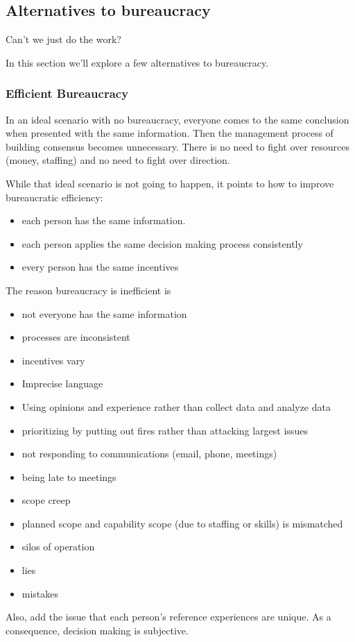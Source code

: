 \subsection{Alternatives to bureaucracy \label{sec:alternatives_to_bureaucracy}}
Can't we just do the work?

In this section we'll explore a few alternatives to bureaucracy. 




\subsubsection{Efficient Bureaucracy}

In an ideal scenario with no bureaucracy, everyone comes to the same conclusion when presented with the same information. Then the management process of building consensus becomes unnecessary. There is no need to fight over resources (money, staffing) and no need to fight over direction.

While that ideal scenario is not going to happen, it points to how to improve bureaucratic efficiency:
\begin{itemize}
\item each person has the same information. 
\item each person applies the same decision making process consistently
\item every person has the same incentives
\end{itemize}
The reason bureaucracy is inefficient is
\begin{itemize}
    \item not everyone has the same information
    \item processes are inconsistent
    \item incentives vary
    \item Imprecise language
    \item Using opinions and experience rather than collect data and analyze data
    \item prioritizing by putting out fires rather than attacking largest issues
    \item not responding to communications (email, phone, meetings)
    \item being late to meetings
    \item scope creep
    \item planned scope and capability scope (due to staffing or skills) is mismatched
    \item silos of operation
    \item lies
    \item mistakes
\end{itemize}
Also, add the issue that each person's reference experiences are unique. As a consequence, decision making is subjective. 




